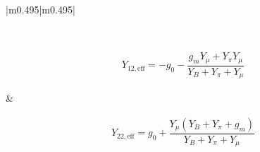 \begin{tabular}{|m{0.495\textwidth}|m{0.495\textwidth}|}
{\begin{minipage}[c][0.18\textheight][c]{0.99\textwidth}
\begin{circuitikz}
\end{circuitikz}
    \vfill
\end{minipage}
}
\\
\hline
\begin{minipage}[c][0.18\textheight][c]{\linewidth}
    \centering

\begin{align}
        Y_{12,\mathrm{eff}} = -g_0-\dfrac{g_mY_{\mu}+Y_{\pi}Y_\mu}{Y_B+Y_{\pi}+Y_{\mu}}
    \end{align}
\end{minipage}
&
\begin{minipage}[c][0.18\textheight][c]{\linewidth}
    \centering

\begin{align}
        Y_{22,\mathrm{eff}} = g_0+\dfrac{Y_{\mu}(Y_B+Y_{\pi}+g_m)}{Y_B+Y_{\pi}+Y_{\mu}}
    \end{align}
\end{minipage}
\\
\hline
\end{tabular}
\label{tab:yeff}
\mbox{}\\

